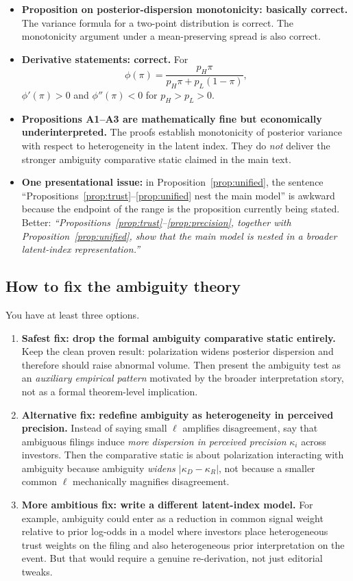 \documentclass[11pt]{article}
\begin{document}
\begin{itemize}
    \item \textbf{Proposition on posterior-dispersion monotonicity: basically correct.} The variance formula for a two-point distribution is correct. The monotonicity argument under a mean-preserving spread is also correct.
    \item \textbf{Derivative statements: correct.} For
    \[
    \phi(\pi)=\frac{p_H\pi}{p_H\pi+p_L(1-\pi)},
    \]
    $\phi'(\pi)>0$ and $\phi''(\pi)<0$ for $p_H>p_L>0$.
    \item \textbf{Propositions A1--A3 are mathematically fine but economically underinterpreted.} The proofs establish monotonicity of posterior variance with respect to heterogeneity in the latent index. They do \emph{not} deliver the stronger ambiguity comparative static claimed in the main text.
    \item \textbf{One presentational issue:} in Proposition~\ref{prop:unified}, the sentence ``Propositions~\ref{prop:trust}--\ref{prop:unified} nest the main model'' is awkward because the endpoint of the range is the proposition currently being stated. Better: \emph{``Propositions~\ref{prop:trust}--\ref{prop:precision}, together with Proposition~\ref{prop:unified}, show that the main model is nested in a broader latent-index representation.''}
\end{itemize}

\subsection*{How to fix the ambiguity theory}
You have at least three options.

\begin{enumerate}
    \item \textbf{Safest fix: drop the formal ambiguity comparative static entirely.} Keep the clean proven result: polarization widens posterior dispersion and therefore should raise abnormal volume. Then present the ambiguity test as an \emph{auxiliary empirical pattern} motivated by the broader interpretation story, not as a formal theorem-level implication.
    \item \textbf{Alternative fix: redefine ambiguity as heterogeneity in perceived precision.} Instead of saying small $\ell$ amplifies disagreement, say that ambiguous filings induce \emph{more dispersion in perceived precision} $\kappa_i$ across investors. Then the comparative static is about polarization interacting with ambiguity because ambiguity \emph{widens $|\kappa_D-\kappa_R|$}, not because a smaller common $\ell$ mechanically magnifies disagreement.
    \item \textbf{More ambitious fix: write a different latent-index model.} For example, ambiguity could enter as a reduction in common signal weight relative to prior log-odds in a model where investors place heterogeneous trust weights on the filing and also heterogeneous prior interpretation on the event. But that would require a genuine re-derivation, not just editorial tweaks.
\end{enumerate}
\end{document}
